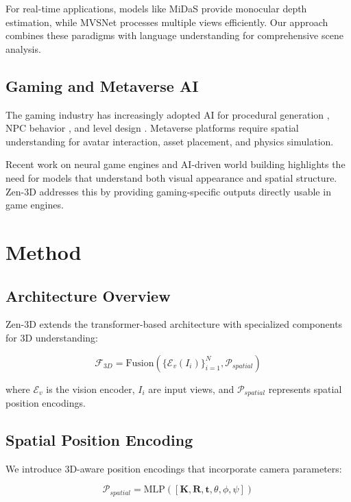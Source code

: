 \documentclass[11pt,a4paper]{article}
\begin{document}
For real-time applications, models like MiDaS \cite{midas} provide monocular depth estimation, while MVSNet \cite{mvsnet} processes multiple views efficiently. Our approach combines these paradigms with language understanding for comprehensive scene analysis.

\subsection{Gaming and Metaverse AI}

The gaming industry has increasingly adopted AI for procedural generation \cite{procgen}, NPC behavior \cite{gameai}, and level design \cite{leveldesign}. Metaverse platforms require spatial understanding for avatar interaction, asset placement, and physics simulation.

Recent work on neural game engines \cite{neuralgame} and AI-driven world building \cite{worldai} highlights the need for models that understand both visual appearance and spatial structure. Zen-3D addresses this by providing gaming-specific outputs directly usable in game engines.

\section{Method}

\subsection{Architecture Overview}

Zen-3D extends the transformer-based architecture with specialized components for 3D understanding:

\begin{equation}
\mathcal{F}_{3D} = \text{Fusion}(\{\mathcal{E}_v(I_i)\}_{i=1}^N, \mathcal{P}_{spatial})
\end{equation}

where $\mathcal{E}_v$ is the vision encoder, $I_i$ are input views, and $\mathcal{P}_{spatial}$ represents spatial position encodings.

\subsection{Spatial Position Encoding}

We introduce 3D-aware position encodings that incorporate camera parameters:

\begin{equation}
\mathcal{P}_{spatial} = \text{MLP}([\mathbf{K}, \mathbf{R}, \mathbf{t}, \theta, \phi, \psi])
\end{equation}
\end{document}
